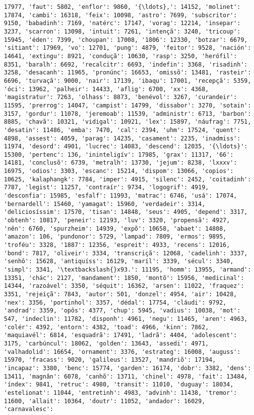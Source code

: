 \begin{Verbatim}[commandchars=\\\{\}]
17977, 'faut': 5802, 'enflor': 9860, '{\ldots},': 14152, 'molinet': 17874, 'cambi': 16318, 'feix': 10098, 'astro': 7699, 'subscritor': 9150, 'babadinh': 7169, 'natérc': 17147, 'vorag': 12214, 'insepar': 3237, 'scarron': 13098, 'intuit': 7261, 'intençã': 3240, 'tricoup': 15945, 'éden': 7399, 'choupan': 17008, '1806': 12330, 'botzar': 6679, 'sitiant': 17969, 'vo': 12701, 'pung': 4879, 'feitor': 9528, 'nación': 14641, 'extingu': 8921, 'conduçã': 10630, 'rasp': 3250, 'herófil': 8351, 'baralh': 6692, 'recalcitr': 6693, 'indefin': 3368, 'risadinh': 3258, 'desacanh': 11965, 'pronúnc': 16653, 'omissõ': 13481, 'rasteir': 6696, 'turvaçã': 9000, 'nair': 17139, 'ibaqu': 17001, 'recepçã': 5359, 'óci': 13962, 'palheir': 14433, 'aflig': 6700, 'xx': 4368, 'magistratur': 7263, 'olhass': 8873, 'benévol': 3267, 'curandeir': 11595, 'prerrog': 14047, 'campist': 14799, 'dissabor': 3270, 'sotain': 3157, 'gordur': 11078, 'jeremoab': 11539, 'administr': 6713, 'barbon': 8885, 'chavã': 10321, 'vidigal': 10921, 'lex': 15897, 'náufrag': 7751, 'desatin': 11486, 'emba': 7470, 'cal': 2394, 'uhm': 17524, 'quent': 4898, 'assest': 4059, 'parag': 14235, 'casament': 2235, 'inadmiss': 11974, 'desord': 4901, 'lucrec': 14083, 'descend': 12035, '{\ldots}': 15300, 'pertenc': 136, 'ininteligív': 17985, 'grax': 11317, '66': 14181, 'conclusõ': 6739, 'metralh': 13730, 'jejum': 8238, 'lxxxv': 16975, 'odios': 3303, 'escanc': 15214, 'dispom': 13066, 'copios': 10625, 'kalaphangk': 7784, 'imper': 4915, 'silenc': 2452, 'coitadinh': 7787, 'legist': 11257, 'contraír': 9734, 'logogrif': 4919, 'desconfia': 15985, 'esfalf': 11993, 'matrac': 6746, 'usá': 17074, 'bernardell': 15460, 'yamagat': 15960, 'verdadeir': 3314, 'deliciosíssim': 17570, 'tisan': 14848, 'seus': 4905, 'depend': 3317, 'obtenh': 10817, 'peneir': 12193, 'luv': 3320, 'propensã': 4927, 'nên': 6760, 'spurzheim': 14939, 'expõ': 10658, 'abaet': 14808, 'amazon': 106, 'pundonor': 5729, 'lampad': 7809, 'ermos': 9895, 'troféu': 3328, '1887': 12356, 'espreit': 4933, 'recens': 12016, 'bond': 7817, 'oliveir': 3334, 'transcriçã': 12068, 'cadelinh': 3337, 'senhô': 15628, 'antiquíss': 16129, 'maríl': 3339, 'sécul': 3340, 'simpl': 3341, '\textbackslash{}x93.': 11195, 'homm': 13955, 'armand': 13351, 'chác': 2127, 'mandament': 1850, 'montõ': 15956, 'medicinal': 14344, 'razoável': 3350, 'séquit': 16362, 'arsen': 11022, 'fraquez': 3351, 'rejeiçã': 7843, 'autor': 501, 'donzel': 4954, 'air': 10428, 'nex': 3356, 'portinhol': 3357, 'dédal': 17754, 'cláudi': 9792, 'andrad': 3359, 'opôs': 4377, 'chup': 5945, 'vadius': 10038, 'mot': 547, 'indeclin': 11782, 'disponh': 4961, 'negu': 11465, 'aren': 4963, 'colér': 4392, 'entorn': 4382, 'toad': 4966, 'kinn': 7862, 'maquiavél': 6814, 'esquadrã': 17491, 'ladrã': 4404, 'adolescent': 3175, 'carbúncul': 18062, 'golden': 13643, 'assedi': 4971, 'valhadolid': 16654, 'ornament': 3376, 'estrateg': 16008, 'auguss': 15970, 'fracass': 9020, 'galileus': 13527, 'mandriõ': 17194, 'incapaz': 3380, 'benc': 15774, 'garden': 16174, 'dobr': 3382, 'dens': 13411, 'magnân': 6078, 'canhõ': 13711, 'chinel': 4978, 'fait': 13484, 'índex': 9841, 'retruc': 4980, 'transit': 11010, 'duguay': 18034, 'estelionat': 11044, 'entretinh': 4983, 'advinh': 11438, 'tremor': 11600, 'allait': 10364, 'doutr': 11052, 'andador': 16029, 'carnavalesc': 
\end{Verbatim}

